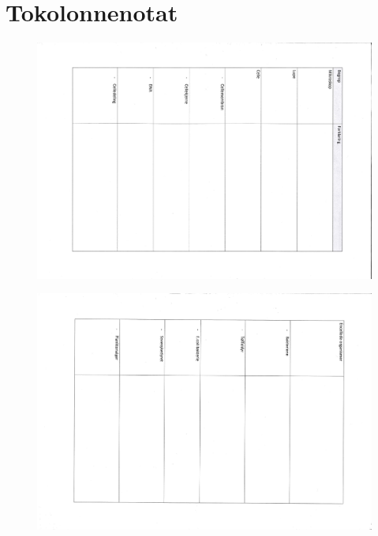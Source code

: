 \documentclass[main.tex]{subfiles}
\begin{document}
\section{Tokolonnenotat}
\begin{figure}[h!]
\includegraphics[scale = 0.75,angle=90]{../figures/tokolonnenotat_side1.pdf}
\end{figure}
\begin{figure}
\includegraphics[scale = 0.75,angle=90]{../figures/tokolonnenotat_side2.pdf}
\end{figure}

\restoregeometry
\end{document}
